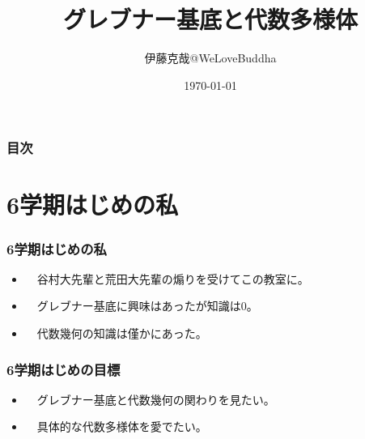 \documentclass[dvipdfmx,22pt,notheorems]{beamer}
\title[略タイトル]{グレブナー基底と代数多様体}%
\author[]{伊藤克哉@WeLoveBuddha}%
\date{\today}%
\theoremstyle{definition}
\begin{document}
\begin{frame}[plain]\frametitle{}
\titlepage %
\end{frame}

\begin{frame}\frametitle{目次}
\tableofcontents %
\end{frame}

\section{6学期はじめの私}
\begin{frame}
	\frametitle{6学期はじめの私}
		\begin{itemize}
			\item　\Large 谷村大先輩と荒田大先輩の煽りを受けてこの教室に。
			\item　\Large グレブナー基底に興味はあったが知識は0。
			\item　\Large 代数幾何の知識は僅かにあった。
		\end{itemize}
	
\end{frame}

\begin{frame}
	\frametitle{6学期はじめの目標}
		\begin{itemize}
			\item　\Large グレブナー基底と代数幾何の関わりを見たい。
			\item　\Large 具体的な代数多様体を愛でたい。
		\end{itemize}
	
\end{frame}
\end{document}
